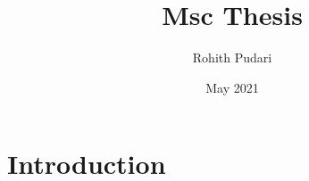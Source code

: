 \documentclass[12pt]{report}
\title{Msc Thesis}
\author{Rohith Pudari}
\date{May 2021}
\begin{document}
\maketitle

\tableofcontents
\listoffigures
\listoftables

\section{Introduction}
\end{document}
